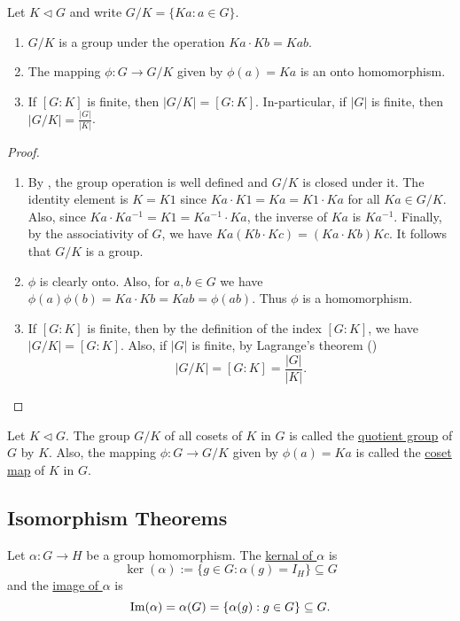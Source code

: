 \documentclass[11pt]{article}
\begin{document}
\begin{proposition}
    Let $K\lhd G$ and write $G/K=\{Ka:a\in G\}$.
    \begin{enumerate}
        \item $G/K$ is a group under the operation $Ka\cdot Kb=Kab$.
        \item The mapping $\phi:G\to G/K$ given by $\phi(a)=Ka$ is an onto homomorphism.
        \item If $[G:K]$ is finite, then $|G/K|=[G:K]$. In-particular, if $|G|$ is finite, then $|G/K|=\frac{|G|}{|K|}$.
    \end{enumerate}
\end{proposition}

\begin{proof}\,
\begin{enumerate}
    \item By , the group operation is well defined and $G/K$ is closed under it. The identity element is $K=K1$ since $Ka\cdot K1=Ka=K1\cdot Ka$ for all $Ka\in G/K$. Also, since $Ka\cdot Ka^{-1}=K1=Ka^{-1}\cdot Ka$, the inverse of $Ka$ is $Ka^{-1}$. Finally, by the associativity of $G$, we have $Ka(Kb\cdot Kc)=(Ka\cdot Kb)Kc$. It follows that $G/K$ is a group.

    \item $\phi$ is clearly onto. Also, for $a,b\in G$ we have $\phi(a)\phi(b)=Ka\cdot Kb=Kab=\phi(ab)$. Thus $\phi$ is a homomorphism.

    \item If $[G:K]$ is finite, then by the definition of the index $[G:K]$, we have $|G/K|=[G:K]$. Also, if $|G|$ is finite, by Lagrange's theorem ()
    \[|G/K|=[G:K]=\frac{|G|}{|K|}.\]
\end{enumerate}
\end{proof}

\begin{definition}
    Let $K\lhd G$. The group $G/K$ of all cosets of $K$ in $G$ is called the \ul{quotient group} of $G$ by $K$. Also, the mapping $\phi:G\to G/K$ given by $\phi(a)=Ka$ is called the \ul{coset map} of $K$ in $G$.
\end{definition}

\subsection{Isomorphism Theorems}

\begin{definition}
    Let $\alpha:G\to H$ be a group homomorphism. The \ul{kernal of $\alpha$} is
    \[\ker(\alpha):=\{g\in G:\alpha(g)=I_H\}\subseteq G\]
    and the \ul{image of $\alpha$} is
    \[\operatorname{Im}(\alpha)=\alpha(G)=\{\alpha(g):g\in G\}\subseteq G.\]
\end{definition}
\end{document}
